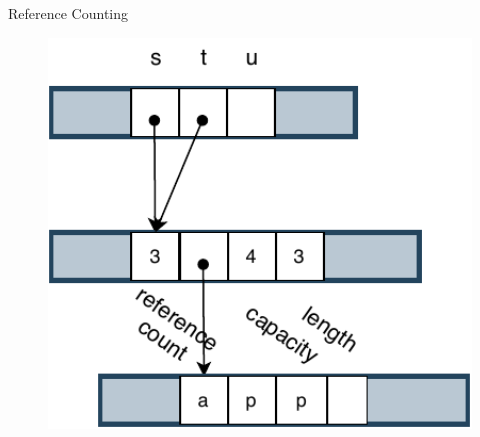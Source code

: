 \documentclass[9pt]{beamer}
\begin{document}
\begin{frame}[fragile]{Reference Counting}
\begin{minipage}{0.3\linewidth}
\begin{figure}[hp]
        \end{figure}
    \end{minipage}     
    \begin{minipage}{0.3\linewidth}
        \begin{figure}[hp]
            \centering
            \begin{center}
                    \includegraphics[width=1.0\textwidth]{images/rc2.pdf}
                    \captionsetup{labelformat=empty}
            \end{center}
            

\end{figure}
\end{minipage}
\end{frame}
\end{document}
